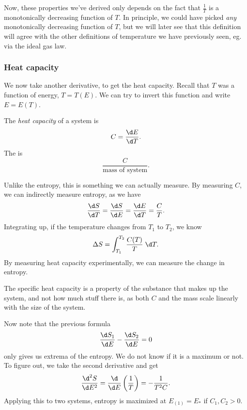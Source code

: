 \documentclass[a4paper]{article}
\begin{document}
Now, these properties we've derived only depends on the fact that $\frac{1}{T}$ is a monotonically decreasing function of $T$. In principle, we could have picked \emph{any} monotonically decreasing function of $T$, but we will later see that this definition will agree with the other definitions of temperature we have previously seen, eg. via the ideal gas law.

\subsubsection*{Heat capacity}
We now take another derivative, to get the heat capacity. Recall that $T$ was a function of energy, $T = T(E)$. We can try to invert this function and write $E = E(T)$.
\begin{defi}
  The \emph{heat capacity} of a system is
  \[
    C = \frac{\d E}{\d T}.
  \]
  The  is
  \[
    \frac{C}{\text{mass of system}}.
  \]
\end{defi}
Unlike the entropy, this is something we can actually measure. By measuring $C$, we can indirectly measure entropy, as we have
\[
  \frac{\d S}{\d T} = \frac{\d S}{\d E} = \frac{\d E}{\d T} = \frac{C}{T}.
\]
Integrating up, if the temperature changes from $T_1$ to $T_2$, we know
\[
  \Delta S = \int_{T_1}^{T_2} \frac{C(T)}{T}\;\d T.
\]
By measuring heat capacity experimentally, we can measure the change in entropy.

The specific heat capacity is a property of the substance that makes up the system, and not how much stuff there is, as both $C$ and the mass scale linearly with the size of the system.

Now note that the previous formula
\[
  \frac{\d S_1}{\d E} - \frac{\d S_2}{\d E} = 0
\]
only gives us extrema of the entropy. We do not know if it is a maximum or not. To figure out, we take the second derivative and get
\[
  \frac{\d^2 S}{\d E^2} = \frac{\d}{\d E} \left(\frac{1}{T}\right) = -\frac{1}{T^2 C}.
\]
Applying this to two systems, entropy is maximized at $E_{(1)} = E_*$ if $C_1, C_2 > 0$.
\end{document}
